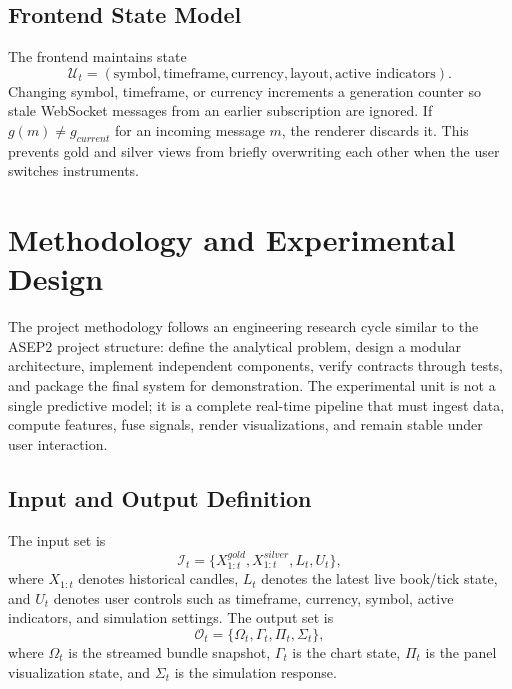 \documentclass[conference]{IEEEtran}
\begin{document}
\subsection{Frontend State Model}

The frontend maintains state
\begin{equation}
\mathcal{U}_t=(\text{symbol},\text{timeframe},\text{currency},\text{layout},
\text{active indicators}).
\end{equation}
Changing symbol, timeframe, or currency increments a generation counter so
stale WebSocket messages from an earlier subscription are ignored. If
$g(m)\neq g_{current}$ for an incoming message $m$, the renderer discards it.
This prevents gold and silver views from briefly overwriting each other when
the user switches instruments.

\section{Methodology and Experimental Design}

The project methodology follows an engineering research cycle similar to the
ASEP2 project structure: define the analytical problem, design a modular
architecture, implement independent components, verify contracts through
tests, and package the final system for demonstration. The experimental unit
is not a single predictive model; it is a complete real-time pipeline that
must ingest data, compute features, fuse signals, render visualizations, and
remain stable under user interaction.

\subsection{Input and Output Definition}

The input set is
\begin{equation}
\mathcal{I}_t=\{X_{1:t}^{gold},X_{1:t}^{silver},L_t,U_t\},
\end{equation}
where $X_{1:t}$ denotes historical candles, $L_t$ denotes the latest live
book/tick state, and $U_t$ denotes user controls such as timeframe, currency,
symbol, active indicators, and simulation settings. The output set is
\begin{equation}
\mathcal{O}_t=\{\Omega_t,\Gamma_t,\Pi_t,\Sigma_t\},
\end{equation}
where $\Omega_t$ is the streamed bundle snapshot, $\Gamma_t$ is the chart
state, $\Pi_t$ is the panel visualization state, and $\Sigma_t$ is the
simulation response.
\end{document}
